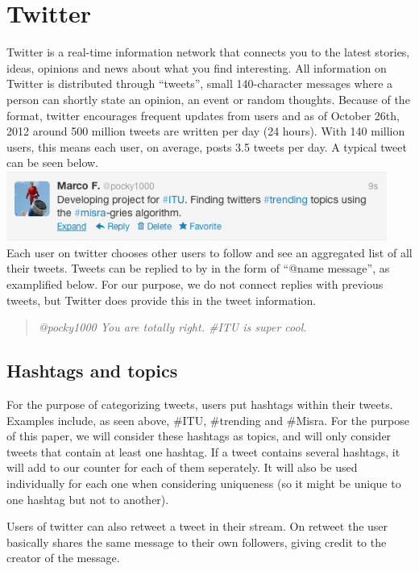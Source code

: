 \section{Twitter}
\label{twitter}
Twitter is a real-time information network that connects you to the latest stories, ideas, opinions and news about what you find interesting. All information on Twitter is distributed through ``tweets'', small 140-character messages where a person can shortly state an opinion, an event or random thoughts. Because of the format, twitter encourages frequent updates from users and as of October 26th, 2012 around 500 million tweets are written per day (24 hours)\cite{Cnet1}. With 140 million users, this means each user, on average, posts 3.5 tweets per day. A typical tweet can be seen below.
\\
\includegraphics[width=125mm]{tweet.png}
\\
Each user on twitter chooses other users to follow and see an aggregated list of all their tweets. Tweets can be replied to by in the form of ``@name message'', as examplified below. For our purpose, we do not connect replies with previous tweets, but Twitter does provide this in the tweet information.

\begin{quote}
    \emph{@pocky1000 You are totally right. \#ITU is super cool.}
\end{quote}

\subsection{Hashtags and topics}
For the purpose of categorizing tweets, users put hashtags within their tweets. Examples include, as seen above, \#ITU, \#trending and \#Misra. For the purpose of this paper, we will consider these hashtags as topics, and will only consider tweets that contain at least one hashtag. If a tweet contains several hashtags, it will add to our counter for each of them seperately. It will also be used individually for each one when considering uniqueness (so it might be unique to one hashtag but not to another).

Users of twitter can also retweet a tweet in their stream. On retweet the user basically shares the same message to their own followers, giving credit to the creator of the message.


